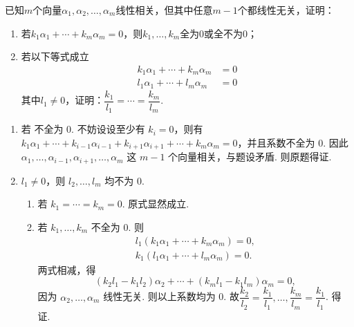 \begin{exercise}
    \begin{exgroup}
        \item 已知$m$个向量$\alpha_1,\alpha_2,\ldots,\alpha_m$线性相关，但其中任意$m-1$个都线性无关，证明：
        \begin{enumerate}
            \item 若$k_1\alpha_1+\cdots+k_m\alpha_m=0$，则$k_1,\ldots,k_m$全为0或全不为0；

            \item 若以下等式成立
                  \begin{align*}
                      k_1\alpha_1+\cdots+k_m\alpha_m & =0 \\
                      l_1\alpha_1+\cdots+l_m\alpha_m & =0
                  \end{align*}
                  其中$l_1\neq 0$，证明：$\dfrac{k_1}{l_1}=\cdots=\dfrac{k_m}{l_m}$.
        \end{enumerate}
        \begin{answer}
            \begin{enumerate}
                \item 若 不全为 0. 不妨设设至少有 $k_i=0$，则有 $k_1\alpha_1+\cdots+k_{i-1}\alpha_{i-1}+k_{i+1}\alpha_{i+1}+\cdots+k_m\alpha_m=0$，并且系数不全为 0. 因此 $\alpha_1,\ldots,\alpha_{i-1},\alpha_{i+1},\ldots,\alpha_m$ 这 $m-1$ 个向量相关，与题设矛盾. 则原题得证.

                \item $l_1\neq 0$，则 $l_2,\ldots,l_m$ 均不为 0.
                      \begin{enumerate}
                          \item 若 $k_1=\cdots=k_m=0$. 原式显然成立.

                          \item 若 $k_1,\ldots,k_m$ 不全为 0. 则
                                \begin{gather*}
                                    l_1(k_1\alpha_1+\cdots+k_m\alpha_m)=0, \\
                                    k_1(l_1\alpha_1+\cdots+l_m\alpha_m)=0.
                                \end{gather*}
                                两式相减，得
                                \[(k_2l_1-k_1l_2)\alpha_2+\cdots+(k_ml_1-k_1l_m)\alpha_m=0,\]
                                因为 $\alpha_2,\ldots,\alpha_m$ 线性无关. 则以上系数均为 0. 故$\dfrac {k_2}{l_2}=\dfrac {k_1}{l_1},\ldots,\dfrac {k_m}{l_m}=\dfrac {k_1}{l_1}$. 得证.
                      \end{enumerate}
            \end{enumerate}
        \end{answer}


\end{exgroup}
\end{exercise}
